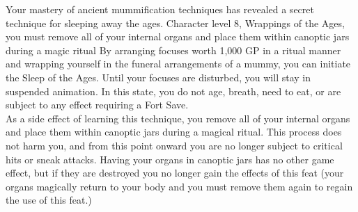 \shortdescfeat
{Your mastery of ancient mummification techniques has revealed a secret technique for sleeping away the ages.}
{Character level 8, Wrappings of the Ages, you must remove all of your internal organs and place them within canoptic jars during a magic ritual}
{By arranging focuses worth 1,000 GP in a ritual manner and wrapping yourself in the funeral arrangements of a mummy, you can initiate the Sleep of the Ages. Until your focuses are disturbed, you will stay in suspended animation. In this state, you do not age, breath, need to eat, or are subject to any effect requiring a Fort Save.\\
As a side effect of learning this technique, you remove all of your internal organs and place them within canoptic jars during a magical ritual. This process does not harm you, and from this point onward you are no longer subject to critical hits or sneak attacks. Having your organs in canoptic jars has no other game effect, but if they are destroyed you no longer gain the effects of this feat (your organs magically return to your body and you must remove them again to regain the use of this feat.)}